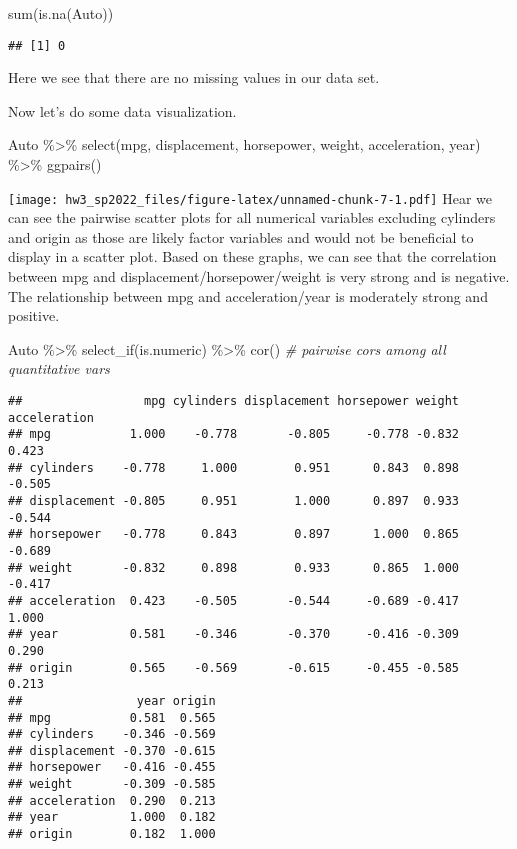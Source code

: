 \documentclass[
]{article}
\newenvironment{Shaded}{\begin{snugshade}}{\end{snugshade}}
\newcommand{\CommentTok}[1]{\textcolor[rgb]{0.56,0.35,0.01}{\textit{#1}}}
\newcommand{\FunctionTok}[1]{\textcolor[rgb]{0.00,0.00,0.00}{#1}}
\newcommand{\NormalTok}[1]{#1}
\newcommand{\SpecialCharTok}[1]{\textcolor[rgb]{0.00,0.00,0.00}{#1}}
\begin{document}
\begin{Shaded}
\begin{Highlighting}[]
\FunctionTok{sum}\NormalTok{(}\FunctionTok{is.na}\NormalTok{(Auto))}
\end{Highlighting}
\end{Shaded}

\begin{verbatim}
## [1] 0
\end{verbatim}

Here we see that there are no missing values in our data set.

Now let's do some data visualization.

\begin{Shaded}
\begin{Highlighting}[]
\NormalTok{Auto }\SpecialCharTok{\%\textgreater{}\%}
  \FunctionTok{select}\NormalTok{(mpg, displacement, horsepower, weight, acceleration, year) }\SpecialCharTok{\%\textgreater{}\%}
  \FunctionTok{ggpairs}\NormalTok{() }
\end{Highlighting}
\end{Shaded}

\texttt{[image: hw3\_sp2022\_files/figure-latex/unnamed-chunk-7-1.pdf]}
Hear we can see the pairwise scatter plots for all numerical variables
excluding cylinders and origin as those are likely factor variables and
would not be beneficial to display in a scatter plot. Based on these
graphs, we can see that the correlation between mpg and
displacement/horsepower/weight is very strong and is negative. The
relationship between mpg and acceleration/year is moderately strong and
positive.

\begin{Shaded}
\begin{Highlighting}[]
\NormalTok{Auto }\SpecialCharTok{\%\textgreater{}\%} \FunctionTok{select\_if}\NormalTok{(is.numeric) }\SpecialCharTok{\%\textgreater{}\%}
  \FunctionTok{cor}\NormalTok{()  }\CommentTok{\# pairwise cor\textquotesingle{}s among all quantitative var\textquotesingle{}s}
\end{Highlighting}
\end{Shaded}

\begin{verbatim}
##                 mpg cylinders displacement horsepower weight acceleration
## mpg           1.000    -0.778       -0.805     -0.778 -0.832        0.423
## cylinders    -0.778     1.000        0.951      0.843  0.898       -0.505
## displacement -0.805     0.951        1.000      0.897  0.933       -0.544
## horsepower   -0.778     0.843        0.897      1.000  0.865       -0.689
## weight       -0.832     0.898        0.933      0.865  1.000       -0.417
## acceleration  0.423    -0.505       -0.544     -0.689 -0.417        1.000
## year          0.581    -0.346       -0.370     -0.416 -0.309        0.290
## origin        0.565    -0.569       -0.615     -0.455 -0.585        0.213
##                year origin
## mpg           0.581  0.565
## cylinders    -0.346 -0.569
## displacement -0.370 -0.615
## horsepower   -0.416 -0.455
## weight       -0.309 -0.585
## acceleration  0.290  0.213
## year          1.000  0.182
## origin        0.182  1.000
\end{verbatim}
\end{document}
